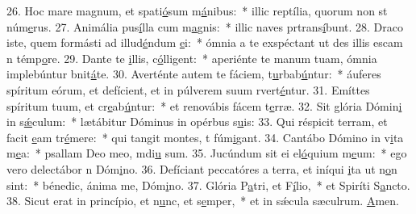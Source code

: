 26. Hoc mare magnum, et spati\uline{ó}sum m\uline{á}nibus:~* illic reptília, quorum non st núm\uline{e}rus.
27. Animália pus\uline{í}lla cum m\uline{a}gnis:~* illic naves prtrans\uline{í}bunt.
28. Draco iste, quem formásti ad illud\uline{é}ndum \uline{e}i:~* ómnia a te exspéctant ut des illis escam n témp\uline{o}re.
29. Dante te \uline{i}llis, c\uline{ó}lligent:~* aperiénte te manum tuam, ómnia implebúntur bnit\uline{á}te.
30. Averténte autem te fáciem, t\uline{u}rbab\uline{ú}ntur:~* áuferes spíritum eórum, et defícient, et in púlverem suum rvert\uline{é}ntur.
31. Emíttes spíritum tuum, et cr\uline{e}ab\uline{ú}ntur:~* et renovábis fácem t\uline{e}rræ.
32. Sit glória Dómin\uline{i} in s\uline{ǽ}culum:~* lætábitur Dóminus in opérbus s\uline{u}is:
33. Qui réspicit terram, et facit \uline{e}am tr\uline{é}mere:~* qui tangit montes, t fúm\uline{i}gant.
34. Cantábo Dómino in v\uline{i}ta m\uline{e}a:~* psallam Deo meo, mdi\uline{u} sum.
35. Jucúndum sit ei el\uline{ó}quium m\uline{e}um:~* ego vero delectábor n Dóm\uline{i}no.
36. Defíciant peccatóres a terra, et iníqui \uline{i}ta ut n\uline{o}n sint:~* bénedic, ánima me, Dóm\uline{i}no.
37. Glória P\uline{a}tri, et F\uline{í}lio,~* et Spiríti S\uline{a}ncto.
38. Sicut erat in princípio, et n\uline{u}nc, et s\uline{e}mper,~* et in sǽcula sæculrum. \uline{A}men.
